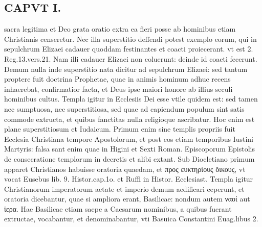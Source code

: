 \documentclass{article}
\begin{document}
\begin{pages}
\section*{CAPVT  I. }
\marginpar{[ p.71 ]}\pstart sacra legitima et Deo grata oratio extra ea fieri posse ab hominibus etiam Christianis censeretur. Nec illa superstitio deffendi potest exemplo eorum, qui in sepulchrum Elizaei cadauer quoddam festinantes et coacti proiecerant. vt est 2. Reg.13.vers.21. Nam illi cadauer Elizaei non coluerunt: deinde id coacti fecerunt. Demum nulla inde superstitio nata dicitur ad sepulchrum Elizaei: sed tantum proptere fuit doctrina Prophetae, quae in animis hominum adhuc recens inhaerebat, confirmatior facta, et Deus ipse maiori honore ab illius seculi hominibus cultus. Templa igitur in Ecclesiis Dei esse vtile quidem est: sed tamen nec sumptuosa, nec superstitiosa, sed quae ad capiendum populum sint satis commode extructa, et quibus fanctitas nulla religioque ascribatur. Hoc enim est plane superstitiosum et Iudaicum. Primum enim sine templis propriis fuit Ecclesia Christiana tempore Apostolorum, et post eos etiam temporibus Iustini Martyris: falsa sant enim quae in Higini et Sexti Roman. Episcoporum Epistolis de consecratione templorum in decretis et alibi extant. Sub Diocletiano primum apparet Christianos habuisse oratoria quaedam, et προς ευκτηρίους  ὄικους, vt vocat Eusebus  lib. 9. Histor.cap.1o. et Ruffi in Histor. Ecclesiast. Templa igitur Christianorum imperatorum aetate et imperio demum aedificari ceperunt, et oratoria dicebantur, quae si ampliora erant, Basilicae: nondum autem ναοί aut ἱερα. Hae Basilicae etiam saepe a Caesarum nominibus, a quibus fuerant extructae, vocabantur, et denominabantur, vti Basuica Constantini Euag.libus 2.  \pend

\end{pages}
\end{document}
